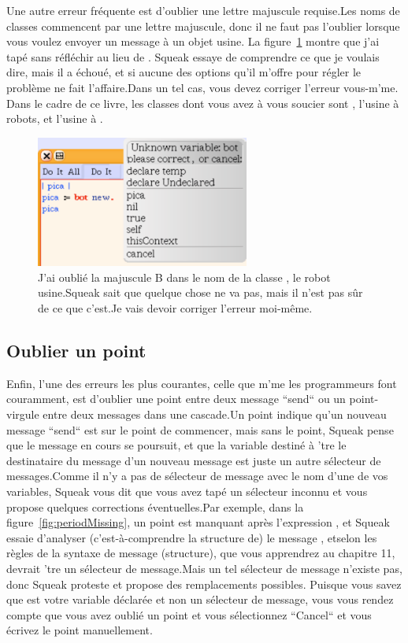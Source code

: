 \documentclass[a4paper,10pt,twoside]{book}
\begin{document}
Une autre erreur fr\'equente est d'oublier une lettre majuscule requise.Les noms de classes commencent par une lettre majuscule, donc il ne faut pas l'oublier lorsque vous voulez envoyer un message \`a un objet usine.  La figure~\ref{fig:TMissing} montre que j'ai tap\'e sans r\'efl\'echir  au lieu de . Squeak essaye de comprendre ce que je voulais dire, mais il a \'echou\'e, et si aucune des options qu'il m'offre pour r\'egler le probl\`eme ne fait l'affaire.Dans un tel cas, vous devez corriger l'erreur vous-m'me. Dans le cadre de ce livre, les classes dont vous avez \`a vous soucier sont , l'usine \`a robots,  et l'usine \`a .

\begin{figure}
\begin{center}\includegraphics[width=7cm]{BMissing}
\caption{J'ai oubli\'e la majuscule B dans le nom de la classe , le robot usine.Squeak sait que quelque chose ne va pas, mais il n'est pas s\^ur de ce que c'est.Je vais devoir corriger l'erreur moi-m\^eme.\label{fig:TMissing}}\end{center}
\end{figure}

\subsection{Oublier un point}

Enfin, l'une des erreurs les plus courantes, celle que m'me les programmeurs font couramment, est d'oublier une point entre deux message ``send`` ou un point-virgule entre deux messages dans une cascade.Un point indique qu'un nouveau message ``send`` est sur le point de commencer, mais sans le point, Squeak pense que le message en cours se poursuit, et que la variable destin\'e \`a 'tre le destinataire du message d'un nouveau message est juste un autre s\'electeur de messages.Comme il n'y a pas de s\'electeur de message avec le nom d'une de vos variables, Squeak vous dit que vous avez tap\'e un s\'electeur inconnu et vous propose quelques corrections \'eventuelles.Par exemple, dans la figure~\ref{fig:periodMissing}, un point  est manquant apr\`es l'expression , et Squeak essaie d'analyser (c'est-\`a-comprendre la structure de) le message , etselon les r\`egles de la syntaxe de message (structure), que vous apprendrez au chapitre 11,  devrait 'tre un s\'electeur de message.Mais un tel s\'electeur de message n'existe pas, donc Squeak proteste et propose des remplacements possibles. Puisque vous savez que  est votre variable d\'eclar\'ee et non un s\'electeur de message, vous vous rendez compte que vous avez oubli\'e un point  et vous s\'electionnez ``Cancel`` et vous \'ecrivez le point manuellement.
\end{document}
